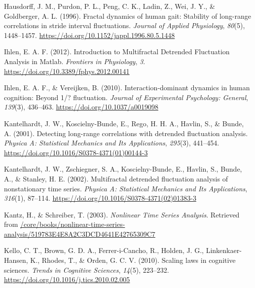 \documentclass[
  man]{apa6}
\newlength{\cslhangindent}
\newlength{\cslentryspacingunit} %
\newenvironment{CSLReferences}[2] %
 {%
  \setlength{\parindent}{0pt}
  \ifodd #1
  \let\oldpar\par
  \def\par{\hangindent=\cslhangindent\oldpar}
  \fi
  \setlength{\parskip}{#2\cslentryspacingunit}
 }%
 {}
\begin{document}
\begin{CSLReferences}{1}{0}
\leavevmode{}%
Hausdorff, J. M., Purdon, P. L., Peng, C. K., Ladin, Z., Wei, J. Y., \& Goldberger, A. L. (1996). Fractal dynamics of human gait: Stability of long-range correlations in stride interval fluctuations. \emph{Journal of Applied Physiology}, \emph{80}(5), 1448--1457. \url{https://doi.org/10.1152/jappl.1996.80.5.1448}

\leavevmode{}%
Ihlen, E. A. F. (2012). Introduction to {Multifractal} {Detrended} {Fluctuation} {Analysis} in {Matlab}. \emph{Frontiers in Physiology}, \emph{3}. \url{https://doi.org/10.3389/fphys.2012.00141}

\leavevmode{}%
Ihlen, E. A. F., \& Vereijken, B. (2010). Interaction-dominant dynamics in human cognition: Beyond 1/{\textflorin}? fluctuation. \emph{Journal of Experimental Psychology: General}, \emph{139}(3), 436--463. \url{https://doi.org/10.1037/a0019098}

\leavevmode{}%
Kantelhardt, J. W., Koscielny-Bunde, E., Rego, H. H. A., Havlin, S., \& Bunde, A. (2001). Detecting long-range correlations with detrended fluctuation analysis. \emph{Physica A: Statistical Mechanics and Its Applications}, \emph{295}(3), 441--454. \url{https://doi.org/10.1016/S0378-4371(01)00144-3}

\leavevmode{}%
Kantelhardt, J. W., Zschiegner, S. A., Koscielny-Bunde, E., Havlin, S., Bunde, A., \& Stanley, H. E. (2002). Multifractal detrended fluctuation analysis of nonstationary time series. \emph{Physica A: Statistical Mechanics and Its Applications}, \emph{316}(1), 87--114. \url{https://doi.org/10.1016/S0378-4371(02)01383-3}

\leavevmode{}%
Kantz, H., \& Schreiber, T. (2003). \emph{Nonlinear Time Series Analysis}. Retrieved from \href{https:///core/books/nonlinear-time-series-analysis/519783E4E8A2C3DCD4641E42765309C7}{/core/books/nonlinear-time-series-analysis/519783E4E8A2C3DCD4641E42765309C7}

\leavevmode{}%
Kello, C. T., Brown, G. D. A., Ferrer-i-Cancho, R., Holden, J. G., Linkenkaer-Hansen, K., Rhodes, T., \& Orden, G. C. V. (2010). Scaling laws in cognitive sciences. \emph{Trends in Cognitive Sciences}, \emph{14}(5), 223--232. \url{https://doi.org/10.1016/j.tics.2010.02.005}


\end{CSLReferences}
\end{document}
